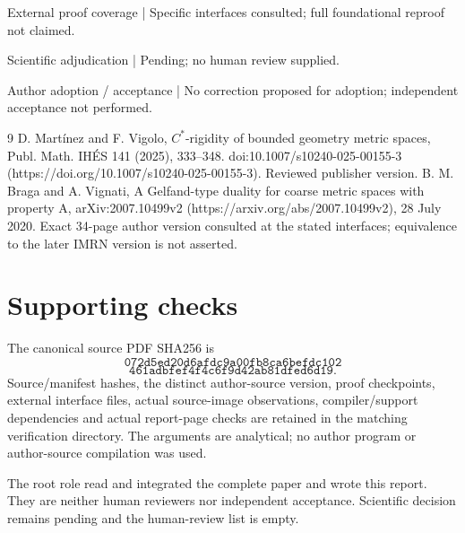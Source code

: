 \documentclass[10pt]{article}
\begin{document}
External proof coverage | Specific interfaces consulted; full foundational reproof not claimed.\par
Scientific adjudication | Pending; no human review supplied.\par
Author adoption / acceptance | No correction proposed for adoption; independent acceptance not performed.\par
9 D. Martínez and F. Vigolo, \(C^*\)-rigidity of bounded geometry metric spaces, Publ. Math. IHÉS 141 (2025), 333–348. doi:10.1007/s10240-025-00155-3 (https://doi.org/10.1007/s10240-025-00155-3). Reviewed publisher version. B. M. Braga and A. Vignati, A Gelfand-type duality for coarse metric spaces with property A, arXiv:2007.10499v2 (https://arxiv.org/abs/2007.10499v2), 28 July 2020. Exact 34-page author version consulted at the stated interfaces; equivalence to the later IMRN version is not asserted.\par
\section*{Supporting checks}
The canonical source PDF SHA256 is \[\texttt{072d5ed20d6afdc9a00fb8ca6befdc102}\] \[\texttt{461adbfef4f4c6f9d42ab81dfed6d19}.\] Source/manifest hashes, the distinct author-source version, proof checkpoints, external interface files, actual source-image observations, compiler/support dependencies and actual report-page checks are retained in the matching verification directory. The arguments are analytical; no author program or author-source compilation was used.\par
The root role read and integrated the complete paper and wrote this report. They are neither human reviewers nor independent acceptance. Scientific decision remains pending and the human-review list is empty.\par
\end{document}

